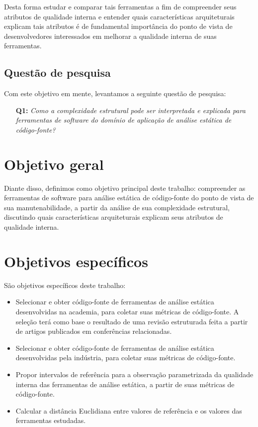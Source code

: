 Desta forma estudar e comparar tais ferramentas a fim de compreender seus
atributos de qualidade interna e entender quais características arquiteturais
explicam tais atributos é de fundamental importância do ponto de vista de
desenvolvedores interessados em melhorar a qualidade interna de suas
ferramentas.

\subsection{Questão de pesquisa}

Com este objetivo em mente, levantamos a seguinte questão de pesquisa:

\begin{enumerate}
  \item [{\bf Q1:}] {\em Como a complexidade estrutural pode ser interpretada
    e explicada para ferramentas de software do domínio de aplicação de
    análise estática de código-fonte?}
\end{enumerate}

\section{Objetivo geral}

Diante disso, definimos como objetivo principal deste trabalho: compreender
as ferramentas de software para análise estática de código-fonte do ponto de
vista de sua manutenabilidade, a partir da análise de sua complexidade
estrutural, discutindo quais características arquiteturais explicam seus
atributos de qualidade interna.

\section{Objetivos específicos}

São objetivos específicos deste trabalho:

\begin{itemize}
  \item Selecionar e obter código-fonte de ferramentas de análise estática
    desenvolvidas na academia, para coletar suas métricas de código-fonte.  A
    seleção terá como base o resultado de uma revisão estruturada feita a
    partir de artigos publicados em conferências relacionadas. 
  \item Selecionar e obter código-fonte de ferramentas de análise estática
    desenvolvidas pela indústria, para coletar suas métricas de código-fonte.
  \item Propor intervalos de referência para a observação parametrizada da
    qualidade interna das ferramentas de análise estática, a partir de suas
    métricas de código-fonte.
  \item Calcular a distância Euclidiana entre valores de referência e os
    valores das ferramentas estudadas.
\end{itemize}

